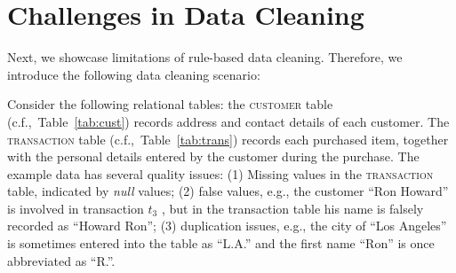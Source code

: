 \section{Challenges in Data Cleaning}
\label{sec:frontiers}

Next, we showcase limitations of rule-based data cleaning. Therefore, we introduce the following data cleaning scenario:
\label{sec:example}
\begin{table}[h]\footnotesize
\scriptsize
{}
\vspace{-1em}
\caption{\textsc{customer} table (with errors)}
\label{tab:cust}
\end{table}

\begin{table}[h]\footnotesize
\scriptsize
{}
\vspace{-1em}
\caption{\textsc{transaction} table (with errors)}
\label{tab:trans}
\end{table}


Consider the following relational tables: the \textsc{customer} table (c.f.,~Table~\ref{tab:cust}) 
records address and contact details of each customer. The \textsc{transaction} table (c.f.,~Table~\ref{tab:trans}) 
records each purchased item, together with the personal details entered by the customer during the purchase. 
The example data has several quality issues: (1) Missing values in the \textsc{transaction} table, indicated by \emph{null} values; (2) false values, e.g.,  the customer ``Ron Howard'' is involved in transaction $t_3$ , but in the transaction table his name is falsely recorded as ``Howard Ron''; (3) duplication issues, e.g., the city of ``Los Angeles'' is sometimes entered into the table as ``L.A.'' and the first name ``Ron'' is once abbreviated as ``R.''. 


